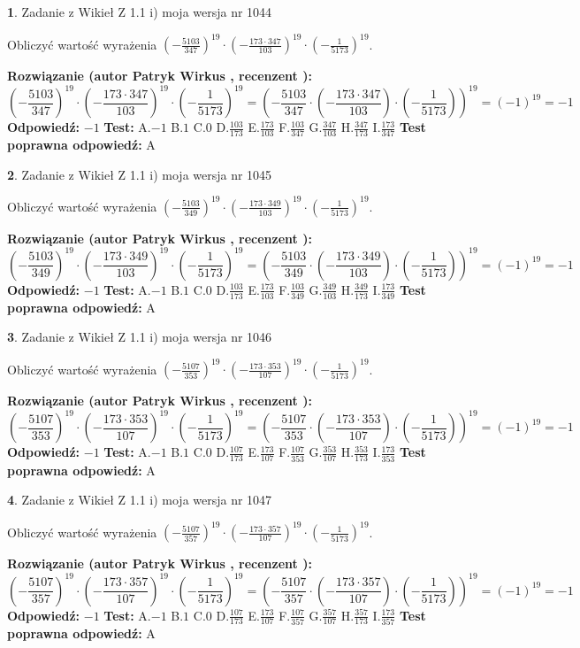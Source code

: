 \documentclass[12pt, a4paper]{article}
\theoremstyle{definition} %
\newtheorem{zad}{}
\newcommand{\zadStart}[1]{\begin{zad}#1\newline}
\newcommand{\zadStop}{\end{zad}}
\newcommand{\rozwStart}[2]{\noindent \textbf{Rozwiązanie (autor #1 , recenzent #2): }\newline}
\newcommand{\rozwStop}{\newline}
\newcommand{\odpStart}{\noindent \textbf{Odpowiedź:}\newline}
\newcommand{\odpStop}{\newline}
\newcommand{\testStart}{\noindent \textbf{Test:}\newline}
\newcommand{\testStop}{\newline}
\newcommand{\kluczStart}{\noindent \textbf{Test poprawna odpowiedź:}\newline}
\newcommand{\kluczStop}{\newline}
\begin{document}
\zadStart{Zadanie z Wikieł Z 1.1 i) moja wersja nr 1044}

Obliczyć wartość wyrażenia $(-\frac{5103}{347})^{19} \cdot (-\frac{173 \cdot 347}{103})^{19} \cdot (-\frac{1}{5173})^{19}$.
\zadStop
\rozwStart{Patryk Wirkus}{}
$$(-\frac{5103}{347})^{19} \cdot (-\frac{173 \cdot 347}{103})^{19} \cdot (-\frac{1}{5173})^{19} = (-\frac{5103}{347} \cdot (-\frac{173 \cdot 347}{103}) \cdot (-\frac{1}{5173}))^{19} = (-1)^{19} = -1$$
\rozwStop
\odpStart
$-1$
\odpStop
\testStart
A.$-1$ B.$1$ C.$0$ D.$\frac{103}{173}$ E.$\frac{173}{103}$
F.$\frac{103}{347}$ G.$\frac{347}{103}$
H.$\frac{347}{173}$
I.$\frac{173}{347}$
\testStop
\kluczStart
A
\kluczStop



\zadStart{Zadanie z Wikieł Z 1.1 i) moja wersja nr 1045}

Obliczyć wartość wyrażenia $(-\frac{5103}{349})^{19} \cdot (-\frac{173 \cdot 349}{103})^{19} \cdot (-\frac{1}{5173})^{19}$.
\zadStop
\rozwStart{Patryk Wirkus}{}
$$(-\frac{5103}{349})^{19} \cdot (-\frac{173 \cdot 349}{103})^{19} \cdot (-\frac{1}{5173})^{19} = (-\frac{5103}{349} \cdot (-\frac{173 \cdot 349}{103}) \cdot (-\frac{1}{5173}))^{19} = (-1)^{19} = -1$$
\rozwStop
\odpStart
$-1$
\odpStop
\testStart
A.$-1$ B.$1$ C.$0$ D.$\frac{103}{173}$ E.$\frac{173}{103}$
F.$\frac{103}{349}$ G.$\frac{349}{103}$
H.$\frac{349}{173}$
I.$\frac{173}{349}$
\testStop
\kluczStart
A
\kluczStop



\zadStart{Zadanie z Wikieł Z 1.1 i) moja wersja nr 1046}

Obliczyć wartość wyrażenia $(-\frac{5107}{353})^{19} \cdot (-\frac{173 \cdot 353}{107})^{19} \cdot (-\frac{1}{5173})^{19}$.
\zadStop
\rozwStart{Patryk Wirkus}{}
$$(-\frac{5107}{353})^{19} \cdot (-\frac{173 \cdot 353}{107})^{19} \cdot (-\frac{1}{5173})^{19} = (-\frac{5107}{353} \cdot (-\frac{173 \cdot 353}{107}) \cdot (-\frac{1}{5173}))^{19} = (-1)^{19} = -1$$
\rozwStop
\odpStart
$-1$
\odpStop
\testStart
A.$-1$ B.$1$ C.$0$ D.$\frac{107}{173}$ E.$\frac{173}{107}$
F.$\frac{107}{353}$ G.$\frac{353}{107}$
H.$\frac{353}{173}$
I.$\frac{173}{353}$
\testStop
\kluczStart
A
\kluczStop



\zadStart{Zadanie z Wikieł Z 1.1 i) moja wersja nr 1047}

Obliczyć wartość wyrażenia $(-\frac{5107}{357})^{19} \cdot (-\frac{173 \cdot 357}{107})^{19} \cdot (-\frac{1}{5173})^{19}$.
\zadStop
\rozwStart{Patryk Wirkus}{}
$$(-\frac{5107}{357})^{19} \cdot (-\frac{173 \cdot 357}{107})^{19} \cdot (-\frac{1}{5173})^{19} = (-\frac{5107}{357} \cdot (-\frac{173 \cdot 357}{107}) \cdot (-\frac{1}{5173}))^{19} = (-1)^{19} = -1$$
\rozwStop
\odpStart
$-1$
\odpStop
\testStart
A.$-1$ B.$1$ C.$0$ D.$\frac{107}{173}$ E.$\frac{173}{107}$
F.$\frac{107}{357}$ G.$\frac{357}{107}$
H.$\frac{357}{173}$
I.$\frac{173}{357}$
\testStop
\kluczStart
A
\kluczStop
\end{document}
